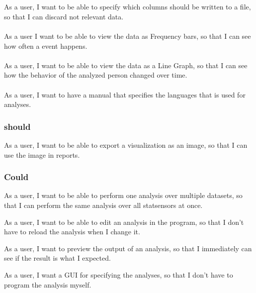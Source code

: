 \\\\
As a user, I want to be able to specify which columns should be written to a file, so that I can discard not relevant data.
\\\\
As a user I want to be able to view the data as Frequency bars, so that I can see how often a event happens.
\\\\
As a user, I want to be able to view the data as a Line Graph, so that I can see how the behavior of the analyzed person changed over time.
\\\\
As a user, I want to have a manual that specifies the languages that is used for analyses.

\subsubsection{should}
As a user, I want to be able to export a visualization as an image, so that I can use the image in reports.

\subsubsection{Could}
As a user, I want to be able to perform one analysis over multiple datasets, so that I can perform the same analysis over all statsensors at once.

As a user, I want to be able to edit an analysis in the program, so that I don't have to reload the analysis when I change it.

As a user, I want to preview the output of an analysis, so that I immediately can see if the result is what I expected.

As a user, I want a GUI for specifying the analyses, so that I don't have to program the analysis myself.
